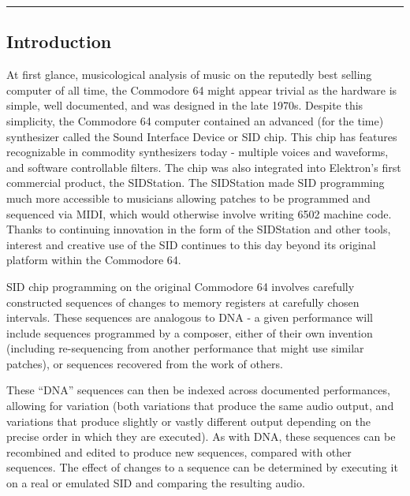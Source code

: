 \documentclass[10pt]{article}
\begin{document}
        \begin{center}
                \rule{150mm}{0.2mm}
        \end{center}

        \vspace{5mm}

\begin{multicols*}{2}

  \section{Introduction}

At first glance, musicological analysis of music on the reputedly best selling computer of all time, the Commodore 64\cite{ieeec64} might appear trivial as the hardware is simple, well documented, and was designed in the late 1970s. Despite this simplicity, the Commodore 64 computer contained an advanced (for the time) synthesizer called the Sound Interface Device\cite{sidpatent} or SID chip. This chip has features recognizable in commodity synthesizers today - multiple voices and waveforms, and software controllable filters. The chip was also integrated into Elektron’s first commercial product, the SIDStation\cite{sidstation}. The SIDStation made SID programming much more accessible to musicians allowing patches to be programmed and sequenced via MIDI, which would otherwise involve writing 6502 machine code. Thanks to continuing innovation in the form of the SIDStation and other tools, interest and creative use of the SID continues to this day beyond its original platform within the Commodore 64.

SID chip programming on the original Commodore 64 involves carefully constructed sequences of changes to memory registers at carefully chosen intervals. These sequences are analogous to DNA - a given performance will include sequences programmed by a composer, either of their own invention (including re-sequencing from another performance that might use similar patches), or sequences recovered from the work of others.

These “DNA” sequences can then be indexed across documented performances, allowing for variation (both variations that produce the same audio output, and variations that produce slightly or vastly different output depending on the precise order in which they are executed). As with DNA, these sequences can be recombined and edited to produce new sequences, compared with other sequences. The effect of changes to a sequence can be determined by executing it on a real or emulated SID and comparing the resulting audio.


\end{multicols*}
\end{document}
